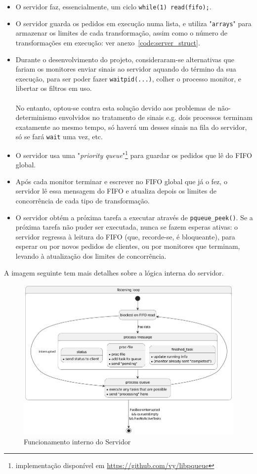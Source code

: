 \documentclass[11pt,a4paper]{report}%
\begin{document}
\begin{itemize}
  \item O servidor faz, essencialmente, um ciclo \lstinline{while(1) read(fifo);}.
  \item O servidor guarda os pedidos em execução numa lista, e utiliza "\lstinline{arrays}" para armazenar
  os limites de cada transformação, assim como o número de transformações em execução: ver anexo~\ref{code:server_struct}.
  \item Durante o desenvolvimento do projeto, consideraram-se alternativas que fariam os monitores enviar
  sinais ao servidor aquando do término da sua execução, para ser poder fazer \lstinline{waitpid(...)}, colher
  o processo monitor, e libertar os filtros em uso.\\
  \\
  No entanto, optou-se contra esta solução devido aos problemas de não-determinismo envolvidos no tratamento de sinais
  e.g. dois processos terminam exatamente ao mesmo tempo, só haverá um desses sinais na fila do servidor, só se fará
  \lstinline{wait} uma vez, etc.
  \item O servidor usa uma "\textit{priority queue}"\footnote{implementação disponível em \url{https://github.com/vy/libpqueue}}\label{footnote:pqueue}
  para guardar os pedidos que lê do FIFO global.
  \item Após cada monitor terminar e escrever no FIFO global que já o fez, o servidor lê essa mensagem do FIFO
  e atualiza depois os limites de concorrência de cada tipo de transformação.
  \item O servidor obtém a próxima tarefa a executar através de \lstinline{pqueue_peek()}. Se a próxima tarefa
  não puder ser executada, nunca se fazem esperas ativas: o servidor regressa à leitura do FIFO
  (que, recorde-se, é bloqueante), para esperar ou por novos pedidos de clientes, ou por monitores que terminam,
  levando à atualização dos limites de concorrência.
\end{itemize}

A imagem seguinte tem mais detalhes sobre a lógica interna do servidor.

\begin{figure}[H]
  \centering
  \includegraphics[scale=0.55]{loopLogic.png}
  \caption{Funcionamento interno do Servidor}
  \label{fig:server}
\end{figure}
\end{document}
